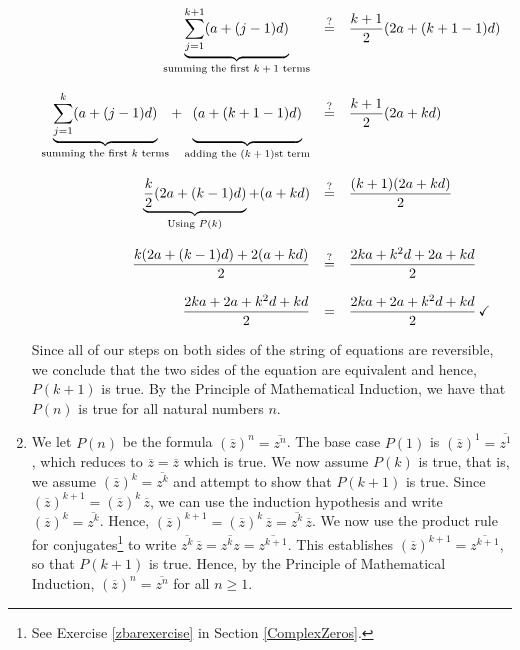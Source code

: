 \begin{ex}
\begin{enumerate}
\[\begin{array}{rcl}

\underbrace{\displaystyle{\sum_{j=1}^{k+1} (a + (j-1)d)}}_{\text{summing the first $k+1$ terms}} & \stackrel{\text{?}}{=} &  \dfrac{k+1}{2}(2a + (k+1- 1)d)   \\

&& \\

\underbrace{\displaystyle{\sum_{j=1}^{k} (a + (j-1)d)}}_{\text{summing the first $k$ terms}} + \underbrace{\vphantom{\displaystyle{\sum_{j=1}^{k+1}}}(a+(k+1-1)d)}_{\text{adding the ($k+1$)st term}} & \stackrel{\text{?}}{=} & \dfrac{k+1}{2}(2a + kd) \\ 

&& \\

\underbrace{\dfrac{k}{2}(2a + (k-1)d)}_{\text{Using $P(k)$}} + (a + kd) & \stackrel{\text{?}}{=} &  \dfrac{(k+1)(2a+kd)}{2} \\ 

&& \\

\dfrac{k(2a+(k-1)d) + 2(a + kd)}{2}  & \stackrel{\text{?}}{=} &  \dfrac{2ka+k^2d + 2a + kd}{2} \\

&& \\
 
\dfrac{2ka + 2a + k^2d + kd}{2}      & = &  \dfrac{2ka + 2a + k^2d + kd}{2}  \, \checkmark \\ 

\end{array} \]

Since all of our steps on both sides of the string of equations are reversible, we conclude that the two sides of the equation are equivalent and hence,  $P(k+1)$ is true.  By the Principle of Mathematical Induction, we have that $P(n)$ is true for all natural numbers $n$. 

\item  We let $P(n)$ be the formula $\left(\overline{z}\right)^n = \overline{z^{n}}$.  The base case $P(1)$ is $\left(\overline{z}\right)^1 = \overline{z^{1}}$, which reduces to $\overline{z} = \overline{z}$ which is true.  We now assume $P(k)$ is true, that is, we assume $\left(\overline{z}\right)^k = \overline{z^{k}}$ and attempt to show that $P(k+1)$ is true.  Since $\left(\overline{z}\right)^{k+1} = \left(\overline{z}\right)^{k} \, \overline{z}$, we can use the induction hypothesis and write $\left(\overline{z}\right)^k = \overline{z^{k}}$.  Hence, $\left(\overline{z}\right)^{k+1} = \left(\overline{z}\right)^{k} \, \overline{z} =  \overline{z^{k}} \, \overline{z}$. We now use the product rule for conjugates\footnote{See Exercise \ref{zbarexercise} in Section \ref{ComplexZeros}.} to write  $\overline{z^{k}} \, \overline{z} = \overline{z^k z} = \overline{z^{k+1}}$. This establishes $\left(\overline{z}\right)^{k+1} = \overline{z^{k+1}}$, so that $P(k+1)$ is true.  Hence, by the Principle of Mathematical Induction, $\left(\overline{z}\right)^n = \overline{z^{n}}$ for all $n \geq 1$.


\end{enumerate}
\end{ex}
